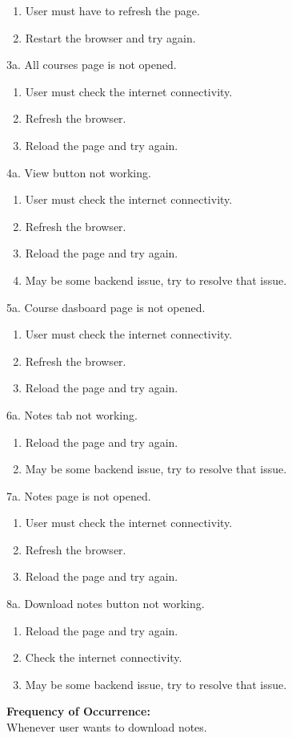 \begin{enumerate}
\item User must have to refresh the page.
\item Restart the browser and try again.
\end{enumerate} 
3a. All courses page is not opened.
\begin{enumerate}
\item User must check the internet connectivity.
\item Refresh the browser.
\item Reload the page and try again.
\end{enumerate}
4a. View button not working.
\begin{enumerate}
\item User must check the internet connectivity.
\item Refresh the browser.
\item Reload the page and try again.
\item May be some backend issue, try to resolve that issue.
\end{enumerate}
5a. Course dasboard page is not opened.
\begin{enumerate}
\item User must check the internet connectivity.
\item Refresh the browser.
\item Reload the page and try again.
\end{enumerate}
6a. Notes tab not working.
\begin{enumerate}
\item Reload the page and try again.
\item May be some backend issue, try to resolve that issue.
\end{enumerate}
7a. Notes page is not opened.
\begin{enumerate}
\item User must check the internet connectivity.
\item Refresh the browser.
\item Reload the page and try again.
\end{enumerate}
8a. Download notes button not working.
\begin{enumerate}
\item Reload the page and try again.
\item Check the internet connectivity.
\item May be some backend issue, try to resolve that issue.
\end{enumerate}
\textbf{Frequency of Occurrence:}\\
Whenever user wants to download notes.




